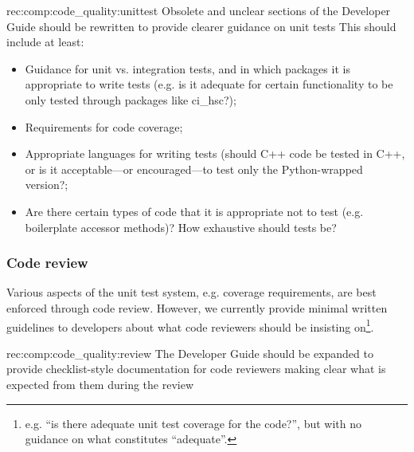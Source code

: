 \begin{recommendation}
    {rec:comp:code_quality:unittest}
    {Obsolete and unclear sections of the Developer Guide should be rewritten to provide clearer guidance on unit tests}
    This should include at least:
\begin{itemize}

  \item{Guidance for unit vs. integration tests, and in which packages it is appropriate to write tests (e.g. is it adequate for certain functionality to be only tested through packages like ci\_hsc?);}
  \item{Requirements for code coverage;}
  \item{Appropriate languages for writing tests (should C++ code be tested in C++, or is it acceptable---or encouraged---to test only the Python-wrapped version?;}
  \item{Are there certain types of code that it is appropriate not to test (e.g. boilerplate accessor methods)? How exhaustive should tests be?}

\end{itemize}

\end{recommendation}

\subsubsection{Code review}
\label{sec:comp:code_quality:review}

Various aspects of the unit test system, e.g. coverage requirements, are best enforced through code review.
However, we currently provide minimal written guidelines to developers about what code reviewers should be insisting on\footnote{e.g. ``is there adequate unit test coverage for the code?'', but with no guidance on what constitutes ``adequate''.}.

\begin{recommendation}
    {rec:comp:code_quality:review}
    {The Developer Guide should be expanded to provide checklist-style documentation for code reviewers making clear what is expected from them
during the review}
\end{recommendation}


